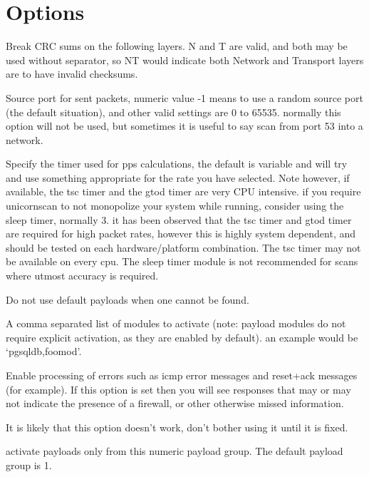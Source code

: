 \documentclass[english]{article}
\begin{document}
\section{Options}
\begin{Description}
\item[\oOptArg{-b, --broken-crc      }{Layer}]
Break CRC sums on the following layers. N and T are valid, and both may be used without separator,
so NT would indicate both Network and Transport layers are to have invalid checksums.
\item[\oOptArg{-B, --source-port     }{Port}]
Source port for sent packets, numeric value -1 means to use a random source port (the default situation),
and other valid settings are 0 to 65535. normally this option will not be used, but sometimes it is useful to say
scan from port 53 into a network.
\item[\oOptArg{-d, --delay-type      }{Type}]
Specify the timer used for pps calculations, the default is variable and will try and use something appropriate
for the rate you have selected. Note however, if available, the tsc timer and the gtod timer are very CPU intensive.
if you require unicornscan to not monopolize your system while running, consider using the sleep timer, normally 3.
it has been observed that the tsc timer and gtod timer are required for high packet rates, however this is highly
system dependent, and should be tested on each hardware/platform combination. The tsc timer may not be available
on every cpu. The sleep timer module is not recommended for scans where utmost accuracy is required.
\item[\oOpt{-D, --no-defpayload   }]
Do not use default payloads when one cannot be found.
\item[\oOptArg{-e, --enable-module   }{List}]
A comma separated list of modules to activate (note: payload modules do not require explicit activation, as they are
enabled by default). an example would be `pgsqldb,foomod'.
\item[   \oOpt{-E, --proc-errors     }]
Enable processing of errors such as icmp error messages and reset+ack messages (for example). If this option is set
then you will see responses that may or may not indicate the presence of a firewall, or other otherwise missed
information.
\item[   \oOpt{-F, --try-frags       }]
It is likely that this option doesn't work, don't bother using it until it is fixed.
\item[\oOptArg{-G, --payload-group   }{Group}]
activate payloads only from this numeric payload group. The default payload group is 1.

\end{Description}
\end{document}
